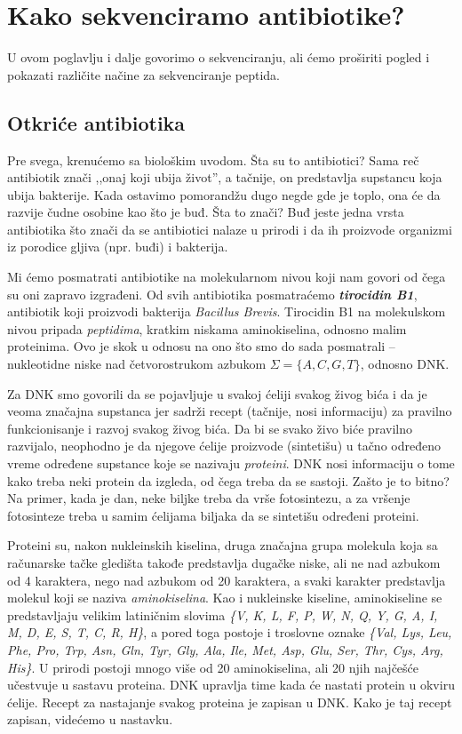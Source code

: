 \chapter{Kako sekvenciramo antibiotike?}
\setbookcodestyle


U ovom poglavlju i dalje govorimo o sekvenciranju, ali ćemo proširiti pogled i pokazati različite načine za sekvenciranje peptida. 

\section{Otkriće antibiotika} \label{otkrice}

Pre svega, krenućemo sa biološkim uvodom. Šta su to antibiotici? Sama reč antibiotik znači ,,onaj koji ubija život'', a tačnije, on predstavlja supstancu koja ubija bakterije. Kada ostavimo pomorandžu dugo negde gde je toplo, ona će da razvije čudne osobine kao što je buđ. Šta to znači? Buđ jeste jedna vrsta antibiotika što znači da se antibiotici nalaze u prirodi i da ih proizvode organizmi iz porodice gljiva (npr. buđi) i bakterija. 

Mi ćemo posmatrati antibiotike na molekularnom nivou koji nam govori od čega su oni zapravo izgrađeni. Od svih antibiotika posmatraćemo \textbf{\textit{tirocidin B1}}, antibiotik koji proizvodi bakterija \textit{Bacillus Brevis}. Tirocidin B1 na molekulskom nivou pripada \textit{peptidima}, kratkim niskama aminokiselina, odnosno malim proteinima. Ovo je skok u odnosu na ono što smo do sada posmatrali -- nukleotidne niske nad četvorostrukom azbukom $\Sigma = \{A, C, G, T\}$, odnosno DNK. 

Za DNK smo govorili da se pojavljuje u svakoj ćeliji svakog živog bića i da je veoma značajna supstanca jer sadrži recept (tačnije, nosi informaciju) za pravilno funkcionisanje i razvoj svakog živog bića. Da bi se svako živo biće pravilno razvijalo, neophodno je da njegove ćelije proizvode (sintetišu) u tačno određeno vreme određene supstance koje se nazivaju \textit{proteini}. DNK nosi informaciju o tome kako treba neki protein da izgleda, od čega treba da se sastoji. Zašto je to bitno? Na primer, kada je dan, neke biljke treba da vrše fotosintezu, a za vršenje fotosinteze treba u samim ćelijama biljaka da se sintetišu određeni proteini.

Proteini su, nakon nukleinskih kiselina, druga značajna grupa molekula koja sa računarske tačke gledišta takođe predstavlja dugačke niske, ali ne nad azbukom od 4 karaktera, nego nad azbukom od 20 karaktera, a svaki karakter predstavlja molekul koji se naziva \textit{aminokiselina}. Kao i nukleinske kiseline, aminokiseline se predstavljaju velikim latiničnim slovima \textit{\{V, K, L, F, P, W, N, Q, Y, G, A, I, M, D, E, S, T, C, R, H\}}, a pored toga postoje i troslovne oznake \textit{\{Val, Lys, Leu, Phe, Pro, Trp, Asn, Gln, Tyr, Gly, Ala, Ile, Met, Asp, Glu, Ser, Thr, Cys, Arg, His\}}. U prirodi postoji mnogo više od 20 aminokiselina, ali 20 njih najčešće učestvuje u sastavu proteina. DNK upravlja time kada će nastati protein u okviru ćelije. Recept za nastajanje svakog proteina je zapisan u DNK. Kako je taj recept zapisan, videćemo u nastavku.

